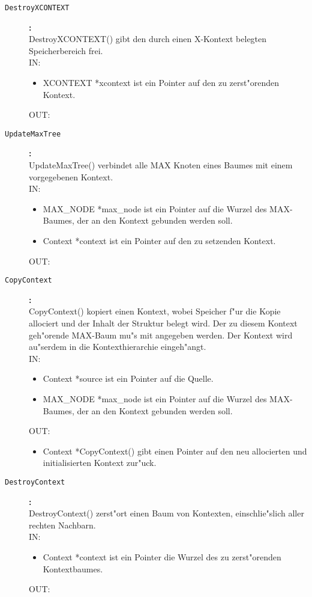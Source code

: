 \begin{description}
\item[\tt DestroyXCONTEXT]{\bf :\\}
DestroyXCONTEXT() gibt den durch einen X-Kontext belegten Speicherbereich frei. \\
IN:
\begin{itemize}
   \item XCONTEXT *xcontext ist ein Pointer auf den zu zerst"orenden Kontext.
\end{itemize}
OUT:

\item[\tt UpdateMaxTree]{\bf :\\}
UpdateMaxTree() verbindet alle MAX Knoten eines Baumes mit einem vorgegebenen Kontext. \\
IN:
\begin{itemize}
   \item MAX\_NODE *max\_node ist ein Pointer auf die Wurzel des MAX-Baumes, der an den Kontext gebunden werden soll.
   \item Context *context ist ein Pointer auf den zu setzenden Kontext.
\end{itemize}
OUT:

\item[\tt CopyContext]{\bf :\\}
CopyContext() kopiert einen Kontext, wobei Speicher f"ur die Kopie allociert und der Inhalt der Struktur belegt wird. Der zu diesem Kontext geh"orende MAX-Baum mu"s mit angegeben werden. Der Kontext wird au"serdem in die Kontexthierarchie eingeh"angt. \\
IN:
\begin{itemize}
   \item Context *source ist ein Pointer auf die Quelle.
   \item MAX\_NODE *max\_node ist ein Pointer auf die Wurzel des MAX-Baumes, der an den Kontext gebunden werden soll.
\end{itemize}
OUT:
\begin{itemize}
   \item Context *CopyContext() gibt einen Pointer auf den neu allocierten und initialisierten Kontext zur"uck.
\end{itemize}

\item[\tt DestroyContext]{\bf :\\}
DestroyContext() zerst"ort einen Baum von Kontexten, einschlie"slich aller rechten Nachbarn. \\
IN:
\begin{itemize}
   \item Context *context ist ein Pointer die Wurzel des zu zerst"orenden Kontextbaumes.
\end{itemize}
OUT:


\end{description}
